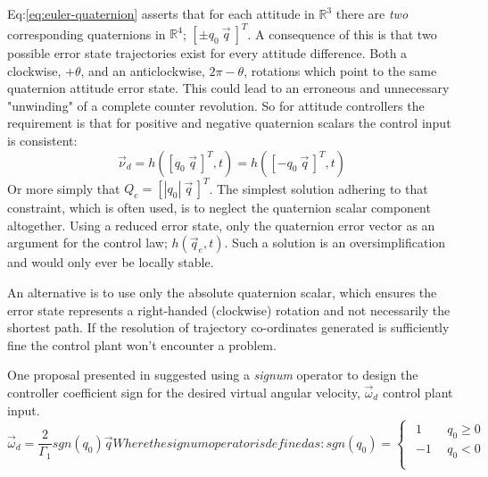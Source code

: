 Eq:\ref{eq:euler-quaternion} asserts that for each attitude in $\mathbb{R}^3$ there are \emph{two} corresponding quaternions in $\mathbb{R}^4$; $[\pm q_0~\vec{q}~]^T$. A consequence of this is that two possible error state trajectories exist for every attitude difference. Both a clockwise, $+\theta$, and an anticlockwise, $2\pi-\theta$, rotations which point to the same quaternion attitude error state. This could lead to an erroneous and unnecessary "unwinding" of a complete counter revolution. So for attitude controllers the requirement is that for positive and negative quaternion scalars the control input is consistent:
\begin{equation}
\vec{\nu}_d=h([q_0~\vec{q}\hspace{2pt}]^T,t)=h([-q_0~\vec{q}\hspace{2pt}]^T,t)
\end{equation}
Or more simply that $Q_e=[|q_0|~\vec{q}\hspace{2pt}]^T$. The simplest solution adhering to that constraint, which is often used, is to neglect the quaternion scalar component altogether. Using a reduced error state, only the quaternion error vector as an argument for the control law; $h(\vec{q}_e,t)$. Such a solution is an oversimplification and would only ever be locally stable. 
\par
An alternative is to use only the absolute quaternion scalar, which ensures the error state represents a right-handed (clockwise) rotation and not necessarily the shortest path. If the resolution of trajectory co-ordinates generated is sufficiently fine the control plant won't encounter a problem.
\par
One proposal presented in \cite{nonlinearquadcopter} suggested using a \emph{signum} operator to design the controller coefficient sign for the desired virtual angular velocity, $\vec{\omega}_d$ control plant input. 
\begin{subequations}\label{eq:signum-unwinding}
\begin{equation}
\vec{\omega}_d=\frac{2}{\Gamma_1}sgn(q_0)\vec{q}
\end{equation}
Where the signum operator is defined as:
\begin{equation}
sgn(q_0)=
\begin{cases}\begin{array}{ll}
1 & ~~q_0\geq 0\\
-1 & ~~q_0< 0\\
\end{array}
\end{cases}
\end{equation}
\end{subequations}
